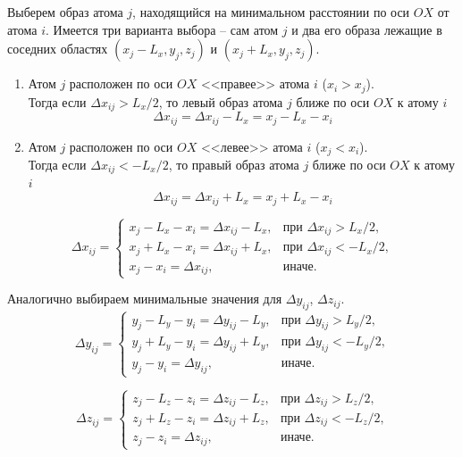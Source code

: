 \documentclass[a4paper, 12pt]{article}
\begin{document}
Выберем образ атома $j$, находящийся на минимальном расстоянии по оси $OX$ от атома $i$. Имеется три варианта выбора -- сам атом $j$ и два его образа лежащие в соседних областях $(x_j - L_x, y_j, z_j)$ и $(x_j + L_x, y_j, z_j)$.
\begin{enumerate}
\item Атом $j$ расположен по оси $OX$ <<правее>> атома $i$ ($x_i > x_j$). \\ Тогда если $\Delta x_{ij} > L_x / 2$, то левый образ атома $j$ ближе по оси 
$OX$ к атому $i$\\
\begin{equation*}
\Delta x_{ij} = \Delta x_{ij} - L_x = x_j - L_x - x_i
\end{equation*}

\item Атом $j$ расположен по оси $OX$ <<левее>> атома $i$ ($x_j < x_i$). \\ Тогда если $\Delta x_{ij} < -L_x / 2$, то правый образ атома $j$ ближе по оси 
$OX$ к атому $i$\\
\begin{equation*}
\Delta x_{ij} = \Delta x_{ij} + L_x = x_j + L_x - x_i
\end{equation*}
\end{enumerate}
\[
\Delta x_{ij} =
\begin{cases}
x_j - L_x - x_i = \Delta x_{ij} - L_x, &\text{при $\Delta x_{ij} > L_x / 2$,}\\
x_j + L_x - x_i = \Delta x_{ij} + L_x, &\text{при $\Delta x_{ij} < -L_x / 2$,}\\
x_j - x_i = \Delta x_{ij}, &\text{иначе.}
\end{cases}
\]

Аналогично выбираем минимальные значения для $\Delta y_{ij}$, $\Delta z_{ij}$.
\[
\Delta y_{ij} =
\begin{cases}
y_j - L_y - y_i = \Delta y_{ij} - L_y, &\text{при $\Delta y_{ij} > L_y / 2$,}\\
y_j + L_y - y_i = \Delta y_{ij} + L_y, &\text{при $\Delta y_{ij} < -L_y / 2$,}\\
y_j - y_i = \Delta y_{ij}, &\text{иначе.}
\end{cases}
\]

\[
\Delta z_{ij} =
\begin{cases}
z_j - L_z - z_i = \Delta z_{ij} - L_z, &\text{при $\Delta z_{ij} > L_z / 2$,}\\
z_j + L_z - z_i = \Delta z_{ij} + L_z, &\text{при $\Delta z_{ij} < -L_z / 2$,}\\
z_j - z_i = \Delta z_{ij}, &\text{иначе.}
\end{cases}
\]
\end{document}
